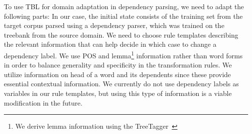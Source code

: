 To use TBL for domain adaptation in dependency parsing, we need to adapt the following parts: In our case, the initial state consists of the training set from the target corpus parsed using a dependency parser, which was trained on the treebank from the source domain.  %
We need to choose rule templates describing the relevant information that can help decide in which case to change a dependency label. 
We use POS  and lemma\footnote{We derive lemma information using the TreeTagger~\cite{schmid1995treetagger}} information rather than word forms in order to balance generality and specificity in the transformation rules. We utilize information on head of a word and its dependents since these provide essential contextual information. %
We currently do not use dependency labels as variables in our rule templates, but using this type of information is a viable modification in the future. %




